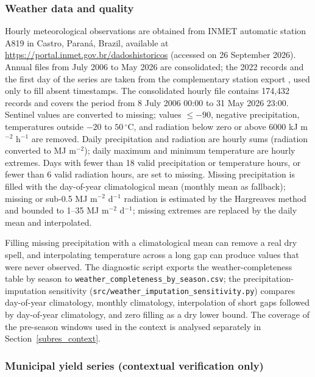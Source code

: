 \documentclass[times,final,authoryear]{elsarticle}
\begin{document}
\subsubsection{Weather data and quality}
\label{subweather}

Hourly meteorological observations are obtained from INMET automatic station A819 in Castro, Paraná, Brazil, available at \url{https://portal.inmet.gov.br/dadoshistoricos} (accessed on 26 September 2026). Annual files from July 2006 to May 2026 are consolidated; the 2022 records and the first day of the series are taken from the complementary station export , used only to fill absent timestamps. The consolidated hourly file contains 174,432 records and covers the period from 8 July 2006 00:00 to 31 May 2026 23:00. Sentinel values are converted to missing; values $\leq -90$, negative precipitation, temperatures outside $-20$ to $50\,^{\circ}$C, and radiation below zero or above 6000 kJ m$^{-2}$ h$^{-1}$ are removed. Daily precipitation and radiation are hourly sums (radiation converted to MJ m$^{-2}$); daily maximum and minimum temperature are hourly extremes. Days with fewer than 18 valid precipitation or temperature hours, or fewer than 6 valid radiation hours, are set to missing. Missing precipitation is filled with the day-of-year climatological mean (monthly mean as fallback); missing or sub-0.5 MJ m$^{-2}$ d$^{-1}$ radiation is estimated by the Hargreaves method and bounded to 1--35 MJ m$^{-2}$ d$^{-1}$; missing extremes are replaced by the daily mean and interpolated.

Filling missing precipitation with a climatological mean can remove a real dry spell, and interpolating temperature across a long gap can produce values that were never observed. The diagnostic script exports the weather-completeness table by season to \texttt{weather\_completeness\_by\_season.csv}; the precipitation-imputation sensitivity (\texttt{src/weather\_imputation\_sensitivity.py}) compares day-of-year climatology, monthly climatology, interpolation of short gaps followed by day-of-year climatology, and zero filling as a dry lower bound. The coverage of the pre-season windows used in the context is analysed separately in Section~\ref{subres_context}.

\subsubsection{Municipal yield series (contextual verification only)}
\label{subsidra}
\end{document}
